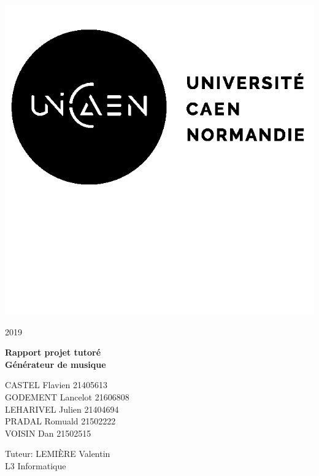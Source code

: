 \documentclass[12pt, a4paper]{article}
\begin{document}
    
    \begin{titlepage}
        \begin{minipage}{0.4\linewidth}
            \includegraphics{img/logo.png}
        \end{minipage}
        \hfill
        \begin{minipage}{0.4\linewidth}
            \begin{flushright}
                2019
            \end{flushright}
        \end{minipage}
        
        \vspace{7cm}
        
        \begin{center}
            \textbf{\Huge{Rapport projet tutoré\\
            Générateur de musique}}
        \end{center}
        
        \vspace{9cm}
        
        \begin{minipage}{0.4\linewidth}
            CASTEL Flavien 21405613\\
            GODEMENT Lancelot 21606808\\
            LEHARIVEL Julien 21404694\\
            PRADAL Romuald 21502222\\
            VOISIN Dan 21502515
        \end{minipage}
        \hfill
        \begin{minipage}{0.4\linewidth}
            \begin{flushright}
                Tuteur: LEMIÈRE Valentin\\
                L3 Informatique
            \end{flushright}
        \end{minipage}
    \end{titlepage}
    
\end{document}
